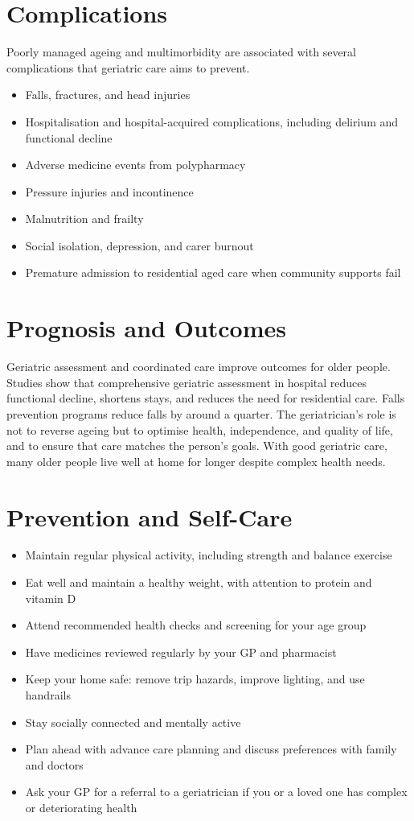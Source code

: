 \section*{Complications}
Poorly managed ageing and multimorbidity are associated with several complications that geriatric care aims to prevent.

\begin{itemize}
    \item Falls, fractures, and head injuries
    \item Hospitalisation and hospital-acquired complications, including delirium and functional decline
    \item Adverse medicine events from polypharmacy
    \item Pressure injuries and incontinence
    \item Malnutrition and frailty
    \item Social isolation, depression, and carer burnout
    \item Premature admission to residential aged care when community supports fail
\end{itemize}

\section*{Prognosis and Outcomes}
Geriatric assessment and coordinated care improve outcomes for older people. Studies show that comprehensive geriatric assessment in hospital reduces functional decline, shortens stays, and reduces the need for residential care. Falls prevention programs reduce falls by around a quarter. The geriatrician's role is not to reverse ageing but to optimise health, independence, and quality of life, and to ensure that care matches the person's goals. With good geriatric care, many older people live well at home for longer despite complex health needs.

\section*{Prevention and Self-Care}
\begin{itemize}
    \item Maintain regular physical activity, including strength and balance exercise
    \item Eat well and maintain a healthy weight, with attention to protein and vitamin D
    \item Attend recommended health checks and screening for your age group
    \item Have medicines reviewed regularly by your GP and pharmacist
    \item Keep your home safe: remove trip hazards, improve lighting, and use handrails
    \item Stay socially connected and mentally active
    \item Plan ahead with advance care planning and discuss preferences with family and doctors
    \item Ask your GP for a referral to a geriatrician if you or a loved one has complex or deteriorating health
\end{itemize}


